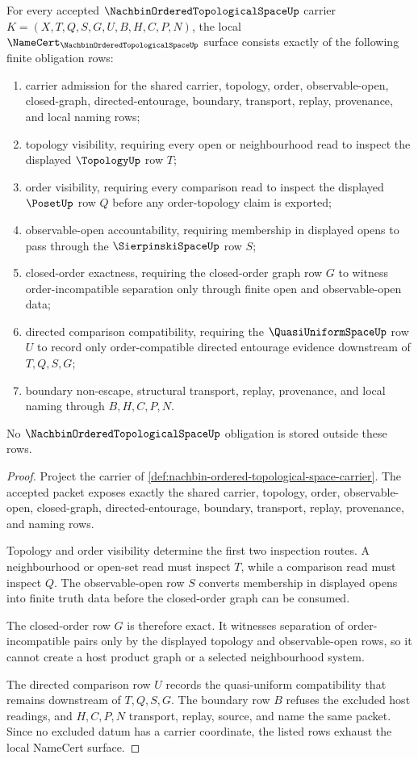 \begin{theorem}\label{thm:nachbin-ordered-topological-space-namecert-obligations}
For every accepted $\NachbinOrderedTopologicalSpaceUp$ carrier $K=(X,T,Q,S,G,U,B,H,C,P,N)$, the local $\NameCert_{\NachbinOrderedTopologicalSpaceUp}$ surface consists exactly of the following finite obligation rows:
\begin{enumerate}
\item carrier admission for the shared carrier, topology, order, observable-open, closed-graph, directed-entourage, boundary, transport, replay, provenance, and local naming rows;
\item topology visibility, requiring every open or neighbourhood read to inspect the displayed $\TopologyUp$ row $T$;
\item order visibility, requiring every comparison read to inspect the displayed $\PosetUp$ row $Q$ before any order-topology claim is exported;
\item observable-open accountability, requiring membership in displayed opens to pass through the $\SierpinskiSpaceUp$ row $S$;
\item closed-order exactness, requiring the closed-order graph row $G$ to witness order-incompatible separation only through finite open and observable-open data;
\item directed comparison compatibility, requiring the $\QuasiUniformSpaceUp$ row $U$ to record only order-compatible directed entourage evidence downstream of $T,Q,S,G$;
\item boundary non-escape, structural transport, replay, provenance, and local naming through $B,H,C,P,N$.
\end{enumerate}
No $\NachbinOrderedTopologicalSpaceUp$ obligation is stored outside these rows.
\end{theorem}
\begin{proof}
Project the carrier of \autoref{def:nachbin-ordered-topological-space-carrier}. The accepted packet exposes exactly the shared carrier, topology, order, observable-open, closed-graph, directed-entourage, boundary, transport, replay, provenance, and naming rows.

Topology and order visibility determine the first two inspection routes. A neighbourhood or open-set read must inspect $T$, while a comparison read must inspect $Q$. The observable-open row $S$ converts membership in displayed opens into finite truth data before the closed-order graph can be consumed.

The closed-order row $G$ is therefore exact. It witnesses separation of order-incompatible pairs only by the displayed topology and observable-open rows, so it cannot create a host product graph or a selected neighbourhood system.

The directed comparison row $U$ records the quasi-uniform compatibility that remains downstream of $T,Q,S,G$. The boundary row $B$ refuses the excluded host readings, and $H,C,P,N$ transport, replay, source, and name the same packet. Since no excluded datum has a carrier coordinate, the listed rows exhaust the local NameCert surface.
\end{proof}

